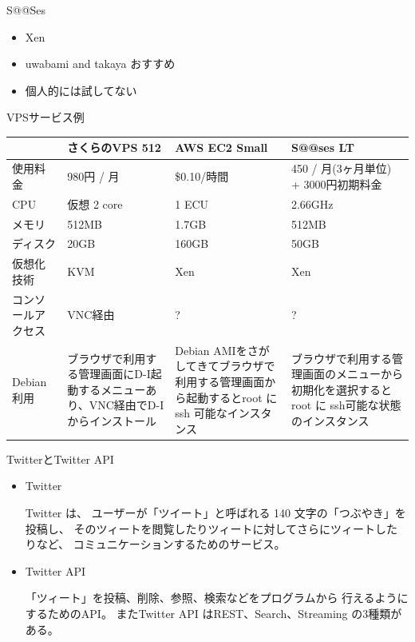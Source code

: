 \begin{frame}{S@@Ses}
 
\begin{itemize}
 \item Xen
 \item uwabami and takaya おすすめ
 \item 個人的には試してない
\end{itemize}

\end{frame}

\begin{frame}{VPSサービス例}

{\small
\begin{tabular}{|p{5em}|p{7em}|p{7em}|p{7em}|}
\hline
 & さくらのVPS 512 & AWS EC2 Small & S@@ses LT \\
\hline
使用料金 & 980円 / 月& \$0.10/時間 & 450 / 月(3ヶ月単位) + 3000円初期料金\\
CPU & 仮想 2 core & 1 ECU & 2.66GHz\\
メモリ & 512MB & 1.7GB& 512MB \\
ディスク & 20GB & 160GB & 50GB \\
仮想化技術 & KVM & Xen & Xen \\
コンソールアクセス & VNC経由 & ? & ? \\
Debian利用 & 
ブラウザで利用する管理画面にD-I起動するメニューあり、VNC経由でD-Iからインストール& 
Debian AMIをさがしてきてブラウザで利用する管理画面から起動するとroot に ssh 可能なインスタンス & 
ブラウザで利用する管理画面のメニューから初期化を選択すると root に ssh可能な状態のインスタンス \\
\hline
\end{tabular}
}

\end{frame}



\begin{frame}{TwitterとTwitter API}

\begin{itemize}

\item Twitter 

Twitter は、 ユーザーが「ツイート」と呼ばれる 140 文字の「つぶやき」を投稿し、
そのツィートを閲覧したりツィートに対してさらにツィートしたりなど、
コミュニケーションするためのサービス。

\item Twitter API 

「ツィート」を投稿、削除、参照、検索などをプログラムから
行えるように するためのAPI。
またTwitter API はREST、Search、Streaming の3種類がある。

\end{itemize}

\end{frame}



